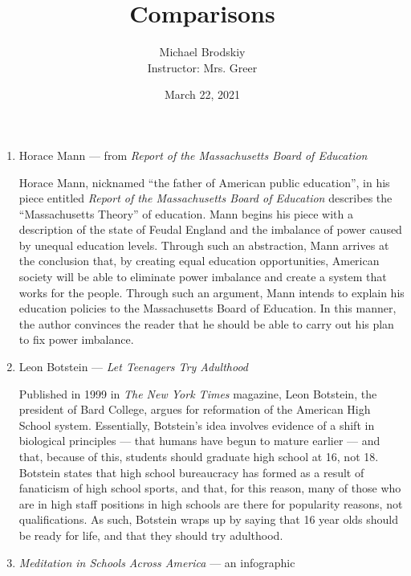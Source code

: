 \documentclass[12pt]{article}
\title{Comparisons}
\date{March 22, 2021}
\author{Michael Brodskiy\\ \small Instructor: Mrs. Greer}
\begin{document}
    \maketitle

    \begin{enumerate}

      \item Horace Mann — from \textit{Report of the Massachusetts Board of Education}

        \begin{justify}
          Horace Mann, nicknamed “the father of American public education”, in his piece entitled \textit{Report of the Massachusetts Board of Education} describes the “Massachusetts Theory” of education. Mann begins his piece with a description of the state of Feudal England and the imbalance of power caused by unequal education levels. Through such an abstraction, Mann arrives at the conclusion that, by creating equal education opportunities, American society will be able to eliminate power imbalance and create a system that works for the people. Through such an argument, Mann intends to explain his education policies to the Massachusetts Board of Education. In this manner, the author convinces the reader that he should be able to carry out his plan to fix power imbalance.
        \end{justify}

      \item Leon Botstein — \textit{Let Teenagers Try Adulthood}

        \begin{justify}
          Published in 1999 in \textit{The New York Times} magazine, Leon Botstein, the president of Bard College, argues for reformation of the American High School system. Essentially, Botstein's idea involves evidence of a shift in biological principles — that humans have begun to mature earlier — and that, because of this, students should graduate high school at 16, not 18. Botstein states that high school bureaucracy has formed as a result of fanaticism of high school sports, and that, for this reason, many of those who are in high staff positions in high schools are there for popularity reasons, not qualifications. As such, Botstein wraps up by saying that 16 year olds should be ready for life, and that they should try adulthood.
        \end{justify}

      \item \textit{Meditation in Schools Across America} — an infographic


\end{enumerate}
\end{document}

